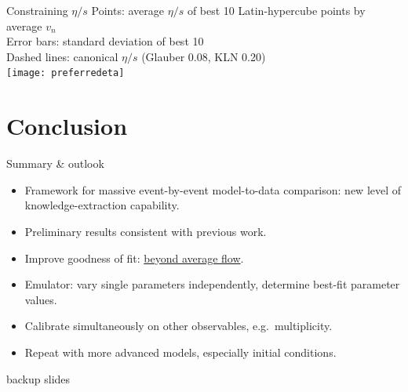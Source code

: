 \documentclass{beamer}
\begin{document}
\begin{frame}{Constraining $\eta/s$}
  \vspace{3mm}
  \small
  Points:  average $\eta/s$ of best 10 Latin-hypercube points by average $v_n$ \\
  Error bars:  standard deviation of best 10 \\
  Dashed lines:  canonical $\eta/s$ (Glauber 0.08, KLN 0.20) \\[1em]
  \texttt{[image: preferredeta]}
\end{frame}


\section{Conclusion}

\begin{frame}[label=conc]{Summary \& outlook}
  \begin{itemize}
    \item Framework for massive event-by-event model-to-data comparison:  new level of knowledge-extraction capability.
    \item Preliminary results consistent with previous work.
      \bgs
    \item Improve goodness of fit:  \hyperlink{likelihood}{beyond average flow}.
    \item Emulator:  vary single parameters independently, determine best-fit parameter values.
    \item Calibrate simultaneously on other observables, e.g.\ multiplicity.
    \item Repeat with more advanced models, especially initial conditions.
  \end{itemize}
\end{frame}



\appendix

\def\backbutton#1{
  \tikz[remember picture,overlay]\node[anchor=south west] at (current page.south west) {\hyperlink{#1}{\footnotesize\color{theme}$\blacktriangleleft$}};
}

\begin{frame}{}
  \centering
  \Large
  backup slides
\end{frame}
\end{document}
